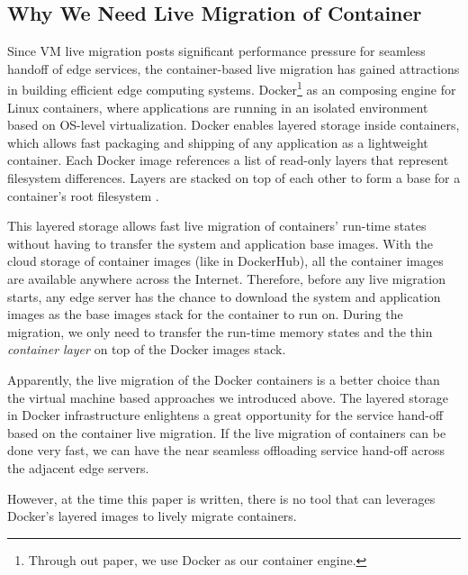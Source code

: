 \subsection{Why We Need Live Migration of Container}
Since VM live migration posts significant performance pressure for seamless handoff of edge services, the container-based live migration has gained attractions in building efficient edge computing systems. %
Docker\footnote{Through out paper, we use Docker as our container engine.} as an composing engine for Linux containers, where applications are running in an isolated environment based on OS-level virtualization. Docker enables layered storage inside containers, which allows fast packaging and shipping of any application as a lightweight container. Each Docker image references a list of read-only layers that represent filesystem differences. Layers are stacked on top of each other to form a base for a container’s root filesystem \cite{dockerlayer}. 

This layered storage allows fast live migration of containers' run-time states without having to transfer the system and application base images. With the cloud storage of container images (like in DockerHub), all the container images are available anywhere across the Internet. Therefore, before any live migration starts, any edge server has the chance to download the system and application images as the base images stack for the container to run on. 
During the migration, we only need to transfer the run-time memory states and the thin \textit{container layer} on top of the Docker images stack. 

Apparently, the live migration of the Docker containers is a better choice than the virtual machine based approaches we introduced above. The layered storage in Docker infrastructure enlightens a great opportunity for the service hand-off based on the container live migration. If the live migration of containers can be done very fast, we can have the near seamless offloading service hand-off across the adjacent edge servers.

However, at the time this paper is written, there is no tool that can leverages Docker's layered images to lively migrate containers. 
